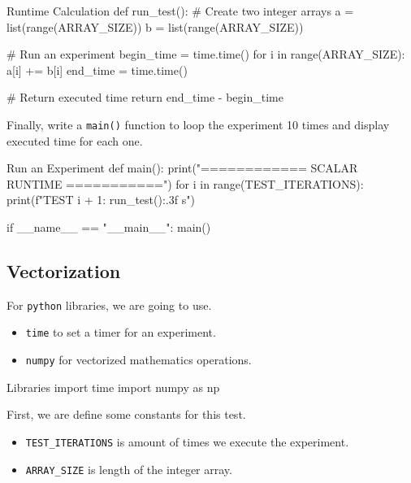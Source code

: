 \documentclass[12pt, a4paper]{article}
\begin{document}
            \begin{codeblock}{Runtime Calculation}
                def run_test():
                    # Create two integer arrays
                    a = list(range(ARRAY_SIZE))
                    b = list(range(ARRAY_SIZE))

                    # Run an experiment
                    begin_time = time.time()
                    for i in range(ARRAY_SIZE):
                        a[i] += b[i]
                    end_time = time.time()

                    # Return executed time
                    return end_time - begin_time
            \end{codeblock}

    \pagebreak

            Finally, write a \texttt{main()} function to loop the experiment 10 times and display executed time for each one.
            \begin{codeblock}{Run an Experiment}
                def main():
                    print("============ SCALAR RUNTIME ===========")
                    for i in range(TEST_ITERATIONS):
                        print(f"TEST {i + 1}: {run_test():.3f} s")

                if __name__ == "__main__":
                    main()
            \end{codeblock}

    \pagebreak

        \subsection{Vectorization}
            For \texttt{python} libraries, we are going to use.
            \begin{itemize}
                \item \texttt{time} to set a timer for an experiment.
                \item \texttt{numpy} for vectorized mathematics operations.
            \end{itemize}

            \begin{codeblock}{Libraries}
                import time
                import numpy as np
            \end{codeblock}

            First, we are define some constants for this test.
            \begin{itemize}
                \item \texttt{TEST\_ITERATIONS} is amount of times we execute the experiment.
                \item \texttt{ARRAY\_SIZE} is length of the integer array.
            \end{itemize}
\end{document}

